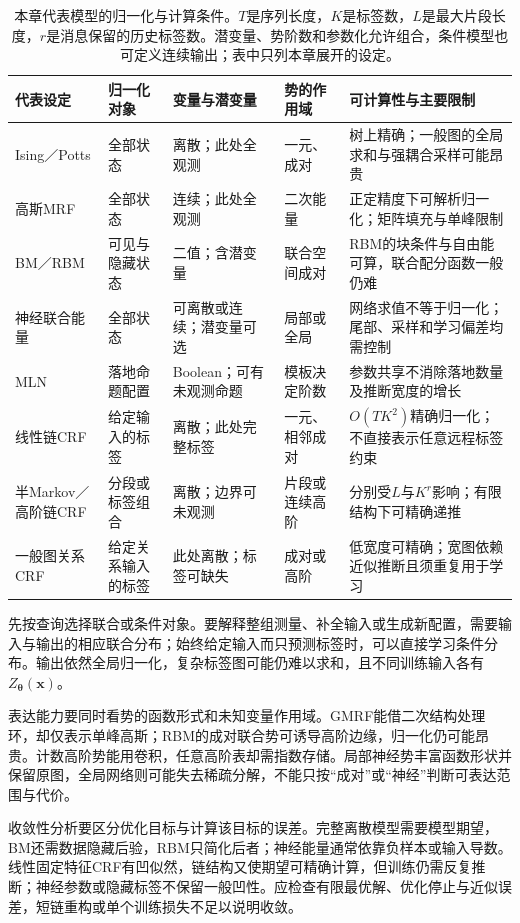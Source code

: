 \begin{table}[htbp]
  \centering
  \small
  \begin{tabularx}{\linewidth}{p{27mm}p{19mm}p{24mm}p{24mm}X}
    \toprule
    代表设定 & 归一化对象 & 变量与潜变量 & 势的作用域 & 可计算性与主要限制\\
    \midrule
    Ising／Potts & 全部状态 & 离散；此处全观测 & 一元、成对 & 树上精确；一般图的全局求和与强耦合采样可能昂贵\\
    高斯MRF & 全部状态 & 连续；此处全观测 & 二次能量 & 正定精度下可解析归一化；矩阵填充与单峰限制\\
    BM／RBM & 可见与隐藏状态 & 二值；含潜变量 & 联合空间成对 & RBM的块条件与自由能可算，联合配分函数一般仍难\\
    神经联合能量 & 全部状态 & 可离散或连续；潜变量可选 & 局部或全局 & 网络求值不等于归一化；尾部、采样和学习偏差均需控制\\
    MLN & 落地命题配置 & Boolean；可有未观测命题 & 模板决定阶数 & 参数共享不消除落地数量及推断宽度的增长\\
    线性链CRF & 给定输入的标签 & 离散；此处完整标签 & 一元、相邻成对 & $O(TK^2)$精确归一化；不直接表示任意远程标签约束\\
    半Markov／高阶链CRF & 分段或标签组合 & 离散；边界可未观测 & 片段或连续高阶 & 分别受$L$与$K^r$影响；有限结构下可精确递推\\
    一般图关系CRF & 给定关系输入的标签 & 此处离散；标签可缺失 & 成对或高阶 & 低宽度可精确；宽图依赖近似推断且须重复用于学习\\
    \bottomrule
  \end{tabularx}
  \caption{本章代表模型的归一化与计算条件。$T$是序列长度，$K$是标签数，$L$是最大片段长度，$r$是消息保留的历史标签数。潜变量、势阶数和参数化允许组合，条件模型也可定义连续输出；表中只列本章展开的设定。}
  \label{tab:pgm-energy-models-comparison}
\end{table}

先按查询选择联合或条件对象。要解释整组测量、补全输入或生成新配置，需要输入与输出的相应联合分布；始终给定输入而只预测标签时，可以直接学习条件分布。输出依然全局归一化，复杂标签图可能仍难以求和，且不同训练输入各有$Z_{\bm{\theta}}(\bm{x})$。

表达能力要同时看势的函数形式和未知变量作用域。GMRF能借二次结构处理环，却仅表示单峰高斯；RBM的成对联合势可诱导高阶边缘，归一化仍可能昂贵。计数高阶势能用卷积，任意高阶表却需指数存储。局部神经势丰富函数形状并保留原图，全局网络则可能失去稀疏分解，不能只按“成对”或“神经”判断可表达范围与代价。

收敛性分析要区分优化目标与计算该目标的误差。完整离散模型需要模型期望，BM还需数据隐藏后验，RBM只简化后者；神经能量通常依靠负样本或输入导数。线性固定特征CRF有凹似然，链结构又使期望可精确计算，但训练仍需反复推断；神经参数或隐藏标签不保留一般凹性。应检查有限最优解、优化停止与近似误差，短链重构或单个训练损失不足以说明收敛。

